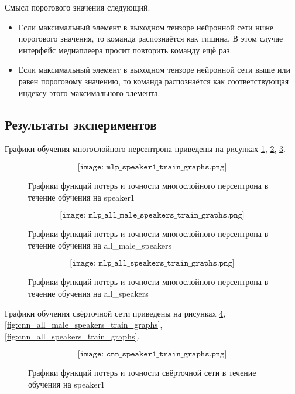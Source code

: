 Смысл порогового значения следующий.
\begin{itemize}[leftmargin=2cm]
	\item Если максимальный элемент в выходном тензоре нейронной сети ниже порогового значения, то команда распознаётся как тишина. В этом случае интерфейс медиаплеера просит повторить команду ещё раз. 
	\item Если максимальный элемент в выходном тензоре нейронной сети выше или равен пороговому значению, то команда распознаётся как соответствующая индексу этого максимального элемента. 
\end{itemize}
\subsection{Результаты экспериментов}
Графики обучения многослойного персептрона приведены на рисунках \ref{fig:mlp_speaker1_train_graphs}, \ref{fig:mlp_all_male_speakers_train_graphs}, \ref{fig:mlp_all_speakers_train_graphs}.

\begin{figure}[H]
	\[\texttt{[image: mlp\_speaker1\_train\_graphs.png]}\]
	\caption{Графики функций потерь и точности многослойного персептрона в течение обучения на speaker1}
	\label{fig:mlp_speaker1_train_graphs}
\end{figure}

\begin{figure}[H]
	\[\texttt{[image: mlp\_all\_male\_speakers\_train\_graphs.png]}\]
	\caption{Графики функций потерь и точности многослойного персептрона в течение обучения на all\_male\_speakers}
	\label{fig:mlp_all_male_speakers_train_graphs}
\end{figure}

\begin{figure}[H]
	\[\texttt{[image: mlp\_all\_speakers\_train\_graphs.png]}\]
	\caption{Графики функций потерь и точности многослойного персептрона в течение обучения на all\_speakers}
	\label{fig:mlp_all_speakers_train_graphs}
\end{figure}


Графики обучения свёрточной сети приведены на рисунках \ref{fig:cnn_speaker1_train_graphs}, \ref{fig:cnn_all_male_speakers_train_graphs}, \ref{fig:cnn_all_speakers_train_graphs}.

\begin{figure}[H]
	\[\texttt{[image: cnn\_speaker1\_train\_graphs.png]}\]
	\caption{Графики функций потерь и точности свёрточной сети в течение обучения на speaker1}
	\label{fig:cnn_speaker1_train_graphs}
\end{figure}

